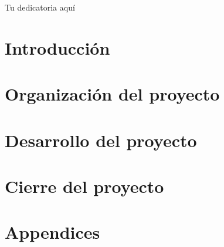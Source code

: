 \documentclass[titlepage,openright,twoside,a4paper,draft,12pt,spanish]{book}
\author{Pedro Parrilla Bascón}{Grado en Ingeniería Informática -Ingeniería de Software}{D.~}{77927669N}
\begin{document}
\makeTitlePage

\pagestyle{empty}
\begin{dedication}
Tu dedicatoria aquí
\end{dedication}
\pagestyle{trinidadPhD}




\tableofcontents
\listoffigures
\listoftables
\listoftodos
\newpage



\lineNumbersOn
\part{Introducción}



\part{Organización del proyecto}




\part{Desarrollo del proyecto}




\part{Cierre del proyecto}






\part{Appendices}
\appendix



\lineNumbersOff

\printglossaries
\newpage



%
\end{document}

